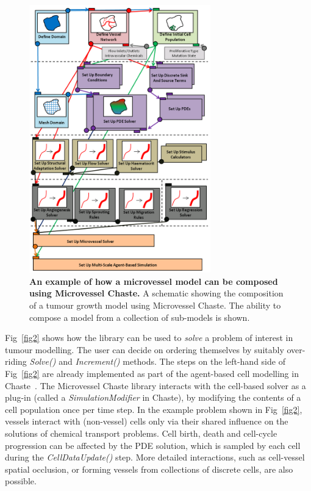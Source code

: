 \documentclass[10pt,letterpaper]{article}
\begin{document}
\begin{figure}[!h]
\centering
\includegraphics[width=0.7\textwidth]{Fig1.png}
\caption{{\bf An example of how a microvessel model can be composed using Microvessel Chaste.}
A schematic showing the composition of a tumour growth model using Microvessel Chaste. The ability to compose a model from a collection of sub-models is shown.}
\label{fig1}
\end{figure}

Fig~\ref{fig2} shows how the library can be used to \emph{solve} a problem of interest in tumour modelling. The user can decide on ordering themselves by suitably over-riding \textit{Solve()} and \textit{Increment()} methods. The steps on the left-hand side of Fig~\ref{fig2} are already implemented as part of the agent-based cell modelling in Chaste~\cite{Mirams2013}. The Microvessel Chaste library interacts with the cell-based solver as a plug-in (called a \textit{SimulationModifier} in Chaste), by modifying the contents of a cell population once per time step. In the example problem shown in Fig~\ref{fig2}, vessels interact with (non-vessel) cells only via their shared influence on the solutions of chemical transport problems. Cell birth, death and cell-cycle progression can be affected by the PDE solution, which is sampled by each cell during the \textit{CellDataUpdate()} step. More detailed interactions, such as cell-vessel spatial occlusion, or forming vessels from collections of discrete cells, are also possible.
\end{document}
